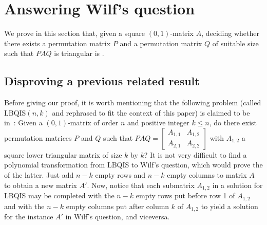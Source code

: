 \documentclass[a4paper,10pt]{llncs}
\begin{document}

\section{Answering Wilf's question}%
\label{section:Hardness result}

We prove in this section that, given a square $(0,1)$-matrix $A$, deciding whether there 
exists a permutation matrix $P$ and a permutation matrix $Q$ of suitable size
such that $PAQ$ is triangular is \NPC.

\subsection{Disproving a previous related result}

Before giving our proof, it is worth mentioning that the following problem
(called LBQIS$(n,k)$ and rephrased to fit the context of this paper) is
claimed to be \NPC in~\cite{DasGuptaJiangKannanLiSweedyk:1998}:
Given a $(0,1)$-matrix of order $n$ and positive integer $k \leq n$,
do there exist permutation matrices $P$ and $Q$ such that
$
PAQ =
\begin{bmatrix}
A_{1,1} & A_{1,2} \\
A_{2,1} & A_{2,2}
\end{bmatrix}
$
with $A_{1,2}$ a square lower triangular matrix of size $k$ by $k$?
It is not very difficult to find a polynomial transformation from
LBQIS to Wilf's question, which would prove the \NPcompleteness of the
latter. Just add $n-k$ empty rows and $n-k$ empty columns 
to matrix $A$ to obtain a new matrix $A'$. Now, notice that each 
submatrix $A_{1,2}$ in a solution for LBQIS may be completed with the 
$n-k$ empty rows put before row 1 of $A_{1,2}$ and with the $n-k$ empty 
columns put after column $k$ of $A_{1,2}$ to yield a solution for the 
instance $A'$ in Wilf's question, and viceversa. 
\end{document}
